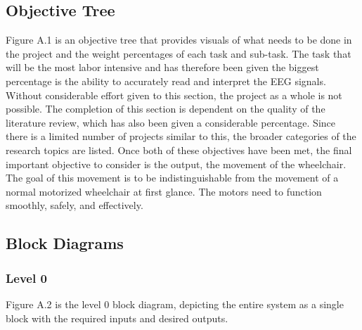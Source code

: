 \documentclass[conference]{IEEEtran}
\begin{document}
    
    \subsection{Objective Tree}
    Figure A.1 is an objective tree that provides visuals of what needs to be done in the project and the weight percentages of each task and sub-task. The task that will be the most labor intensive and has therefore been given the biggest percentage is the ability to accurately read and interpret the EEG signals. Without considerable effort given to this section, the project as a whole is not possible. The completion of this section is dependent on the quality of the literature review, which has also been given a considerable percentage. Since there is a limited number of projects similar to this, the broader categories of the research topics are listed. Once both of these objectives have been met, the final important objective to consider is the output, the movement of the wheelchair. The goal of this movement is to be indistinguishable from the movement of a normal motorized wheelchair at first glance. The motors need to function smoothly, safely, and effectively.
    
    
    
    \subsection{Block Diagrams}
        \subsubsection{Level 0}
        Figure A.2 is the level 0 block diagram, depicting the entire system as a single block with the required inputs and desired outputs. 
\end{document}
